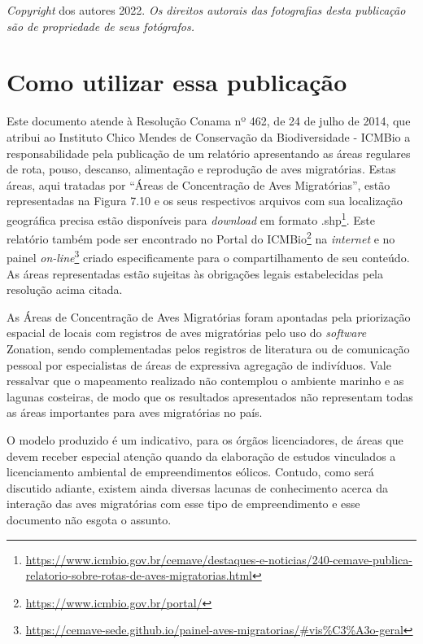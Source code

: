 \documentclass[
  oneside]{scrbook}
\DeclareRobustCommand{\href}[2]{#2\footnote{\url{#1}}}
\begin{document}
\emph{Copyright} dos autores 2022. \emph{Os direitos autorais das fotografias desta publicação são de propriedade de seus fotógrafos.}

\hypertarget{como-utilizar}{%
\chapter*{Como utilizar essa publicação}\label{como-utilizar}}

Este documento atende à Resolução Conama nº 462, de 24 de julho de 2014, que atribui ao Instituto Chico Mendes de Conservação da Biodiversidade - ICMBio a responsabilidade pela publicação de um relatório apresentando as áreas regulares de rota, pouso, descanso, alimentação e reprodução de aves migratórias. Estas áreas, aqui tratadas por ``Áreas de Concentração de Aves Migratórias'', estão representadas na Figura 7.10 e os seus respectivos arquivos com sua localização geográfica precisa estão \href{https://www.icmbio.gov.br/cemave/destaques-e-noticias/240-cemave-publica-relatorio-sobre-rotas-de-aves-migratorias.html}{disponíveis para \emph{download} em formato .shp}. Este relatório também pode ser encontrado no \href{https://www.icmbio.gov.br/portal/}{Portal do ICMBio} na \emph{internet} e no \href{https://cemave-sede.github.io/painel-aves-migratorias/\#vis\%C3\%A3o-geral}{painel \emph{on-line}} criado especificamente para o compartilhamento de seu conteúdo. As áreas representadas estão sujeitas às obrigações legais estabelecidas pela resolução acima citada.

As Áreas de Concentração de Aves Migratórias foram apontadas pela priorização espacial de locais com registros de aves migratórias pelo uso do \emph{software} Zonation, sendo complementadas pelos registros de literatura ou de comunicação pessoal por especialistas de áreas de expressiva agregação de indivíduos. Vale ressalvar que o mapeamento realizado não contemplou o ambiente marinho e as lagunas costeiras, de modo que os resultados apresentados não representam todas as áreas importantes para aves migratórias no país.

O modelo produzido é um indicativo, para os órgãos licenciadores, de áreas que devem receber especial atenção quando da elaboração de estudos vinculados a licenciamento ambiental de empreendimentos eólicos. Contudo, como será discutido adiante, existem ainda diversas lacunas de conhecimento acerca da interação das aves migratórias com esse tipo de empreendimento e esse documento não esgota o assunto.
\end{document}
